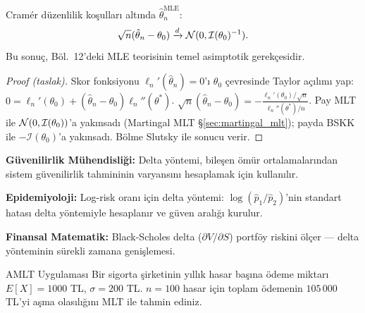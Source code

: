 \begin{teorem}\label{thm:mle_asimptotik}
Cramér düzenlilik koşulları altında $\hat\theta_n^{\mathrm{MLE}}$:
\[
  \sqrt{n}(\hat\theta_n-\theta_0)\xrightarrow{d}\mathcal{N}(0,\mathcal{I}(\theta_0)^{-1}).
\]
Bu sonuç, Böl.~12'deki MLE teorisinin temel asimptotik gerekçesidir.
\end{teorem}

\begin{proof}[Proof (taslak)]
Skor fonksiyonu $\ell_n'(\hat\theta_n)=0$'ı $\theta_0$ çevresinde Taylor açılımı yap:
$0=\ell_n'(\theta_0)+(\hat\theta_n-\theta_0)\ell_n''(\theta^*)$.
$\sqrt{n}(\hat\theta_n-\theta_0)=-\frac{\ell_n'(\theta_0)/\sqrt{n}}{\ell_n''(\theta^*)/n}$.
Pay MLT ile $\mathcal{N}(0,\mathcal{I}(\theta_0))$'a yakınsadı (Martingal MLT §\ref{sec:martingal_mlt}); payda BSKK ile $-\mathcal{I}(\theta_0)$'a yakınsadı. Bölme Slutsky ile sonucu verir.
\end{proof}

\begin{disiplinlerarasibaglan}
\textbf{Güvenilirlik Mühendisliği:} Delta yöntemi, bileşen ömür ortalamalarından sistem güvenilirlik tahmininin varyansını hesaplamak için kullanılır.

\textbf{Epidemiyoloji:} Log-risk oranı için delta yöntemi: $\log(\hat p_1/\hat p_2)$'nin standart hatası delta yöntemiyle hesaplanır ve güven aralığı kurulur.

\textbf{Finansal Matematik:} Black-Scholes delta ($\partial V/\partial S$) portföy riskini ölçer --- delta yönteminin sürekli zamana genişlemesi.
\end{disiplinlerarasibaglan}


\cozumlualistirmalar

\begin{alistirma}[Al.8.1]{A}{MLT Uygulaması}
Bir sigorta şirketinin yıllık hasar başına ödeme miktarı $E[X] = 1000$ TL,
$\sigma = 200$ TL. $n = 100$ hasar için toplam ödemenin $105\,000$ TL'yi aşma
olasılığını MLT ile tahmin ediniz.
\end{alistirma}

